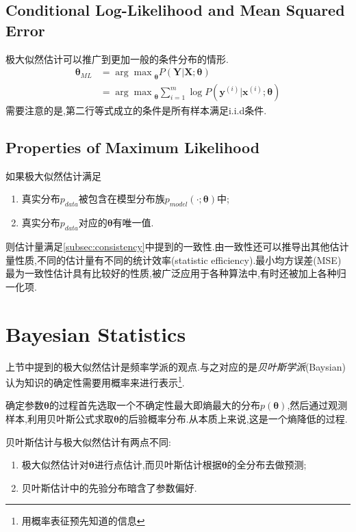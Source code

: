 \subsection{Conditional Log-Likelihood and Mean Squared Error}

极大似然估计可以推广到更加一般的条件分布的情形.
\begin{equation}\begin{split}
{\bm\theta}_{ML}&={\arg\max}_{\bm\theta} P(\bm Y|\bm X;{\bm\theta})\\
&={\arg\max}_{\bm\theta}\sum_{i=1}^m\log P(\bm y^{(i)}|\bm x^{(i)};{\bm\theta})
\end{split}\end{equation}
需要注意的是,第二行等式成立的条件是所有样本满足i.i.d条件.

\subsection{Properties of Maximum Likelihood}

如果极大似然估计满足
\begin{enumerate}
\item 真实分布$p_{data}$被包含在模型分布族$p_{model}(\cdot;{\bm\theta})$中;
\item 真实分布$p_{data}$对应的${\bm\theta}$有唯一值.
\end{enumerate}
则估计量满足\ref{subsec:consistency}中提到的一致性.由一致性还可以推导出其他估计量性质,不同的估计量有不同的统计效率(statistic efficiency).最小均方误差(MSE)最为一致性估计具有比较好的性质,被广泛应用于各种算法中,有时还被加上各种归一化项.

\section{Bayesian Statistics}

上节中提到的极大似然估计是频率学派的观点.与之对应的是\textit{贝叶斯学派}(Baysian)认为知识的确定性需要用概率来进行表示\footnote{用概率表征预先知道的信息}.

确定参数${\bm\theta}$的过程首先选取一个不确定性最大即熵最大的分布$p({\bm\theta})$,然后通过观测样本,利用贝叶斯公式求取${\bm\theta}$的后验概率分布.从本质上来说,这是一个熵降低的过程.

贝叶斯估计与极大似然估计有两点不同:
\begin{enumerate}
\item 极大似然估计对${\bm\theta}$进行点估计,而贝叶斯估计根据${\bm\theta}$的全分布去做预测;
\item 贝叶斯估计中的先验分布暗含了参数偏好.
\end{enumerate}

